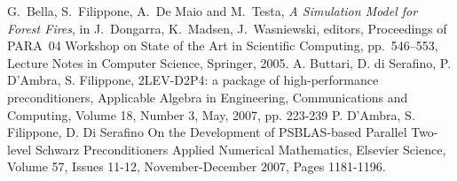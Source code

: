 \documentclass[10pt,a4paper,twoside]{article}
\begin{document}
\begin{thebibliography}{99}

G.~Bella, S.~Filippone, A.~De Maio and M.~Testa,
{\em A Simulation Model for Forest Fires},
in J.~Dongarra, K.~Madsen, J.~Wasniewski, editors,
Proceedings of PARA~04 Workshop on State of the Art
in Scientific Computing, pp.~546--553, Lecture Notes in Computer Science,
Springer, 2005.
 A. Buttari, D. di Serafino, P. D'Ambra, S. Filippone,\newblock
2LEV-D2P4: a package of high-performance preconditioners,\newblock
Applicable Algebra in Engineering, Communications and Computing, 
Volume 18, Number 3, May, 2007, pp.  223-239
%
  P. D'Ambra, S. Filippone,  D. Di Serafino\newblock
On the Development of PSBLAS-based Parallel Two-level Schwarz Preconditioners
\newblock
Applied Numerical Mathematics, Elsevier Science, 
Volume 57, Issues 11-12, November-December 2007, Pages 1181-1196.


\end{thebibliography}
\end{document}
